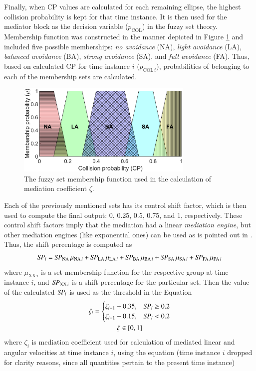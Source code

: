 Finally, when CP values are calculated for each remaining ellipse, the highest collision probability is kept for that time instance. It is then used for the mediator block as the decision variable ($p_{\textrm{COL}}$) in the fuzzy set theory. Membership function was constructed in the manner depicted in Figure \ref{Fig:Fuzzy} and included five possible memberships:  \emph{no avoidance} (NA), \emph{light avoidance} (LA), \emph{balanced avoidance} (BA), \emph{strong avoidance} (SA), and \emph{full avoidance} (FA). Thus, based on calculated CP for time instance $i$ ($p_{\textrm{COL}\,i}$), probabilities of belonging to each of the membership sets are calculated. 

\begin{figure}
\centering
\includegraphics[width=0.75\textwidth]{slike/fuzzy_member.eps}
\caption{The fuzzy set membership function used in the calculation of mediation coefficient $\zeta$.} 
\label{Fig:Fuzzy}
\end{figure}

Each of the previously mentioned sets has its control shift factor, which is then used to compute the final output: 0, 0.25, 0.5, 0.75, and 1, respectively. These control shift factors imply that the mediation had a linear \textit{mediation engine}, but other mediation engines (like exponential ones) can be used as is pointed out in \cite{Vincenti2009}. Thus, the shift percentage is computed as
\[
    \mathit{SP}_i = \mathit{SP}_{\textrm{NA}} \, \mu_{{\textrm{NA}}\,i} + \mathit{SP}_{\textrm{LA}} \, \mu_{{\textrm{LA}}\,i} + \mathit{SP}_{\textrm{BA}} \, \mu_{{\textrm{BA}}\,i} + \mathit{SP}_{\textrm{SA}} \, \mu_{{\textrm{SA}}\,i} + \mathit{SP}_{\textrm{FA}} \, \mu_{{\textrm{FA}}\,i}
\]
where $\mu_{\textrm{XX}\,i}$ is a set membership function for the respective group at time instance $i$, and $\mathit{SP}_{\textrm{XX}\,i}$ is a shift percentage for the particular set. Then the value of the calculated $\mathit{SP}_i$ is used as the threshold in the Equation
\begin{equation}
    \label{Eq:zeta_SP}
    \begin{gathered}
        \zeta_{i} =
        \begin{cases}
        \zeta_{i-1}+0.35, & \mathit{SP}_i\geq 0.2 \\
        \zeta_{i-1}-0.15, & \mathit{SP}_i < 0.2
        \end{cases}\\
        \zeta\in [0,1]
    \end{gathered}
\end{equation}
where $\zeta_i$ is mediation coefficient used for calculation of mediated linear and angular velocities at time instance $i$, using the equation (time instance $i$ dropped for clarity reasons, since all quantities pertain to the present time instance)

